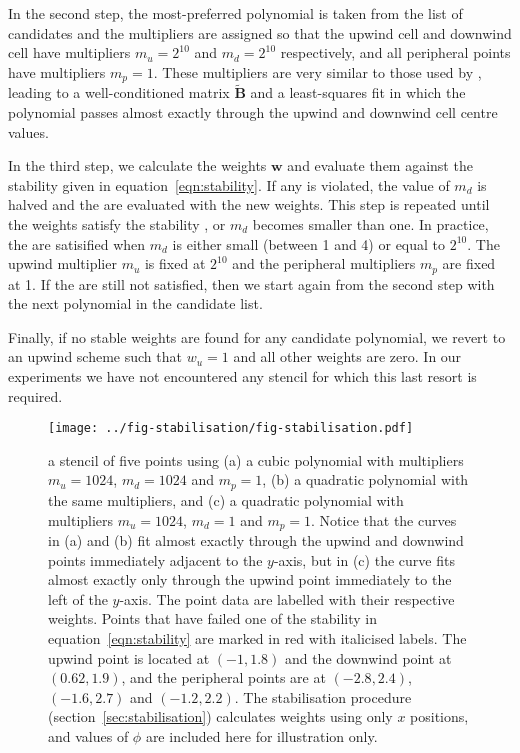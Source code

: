 In the second step, the most-preferred polynomial is taken from the list of candidates and the multipliers are assigned so that the upwind cell and downwind cell have multipliers $m_u = 2^{10}$ and $m_d = 2^{10}$ respectively, and all peripheral points have multipliers $m_p = 1$.  These multipliers are very similar to those used by \citep{lashley2002}, leading to a well-conditioned matrix $\mathbf{\tilde{B}}$ and a least-squares fit in which the polynomial passes almost exactly through the upwind and downwind cell centre values.

In the third step, we calculate the weights $\mathbf{w}$ and evaluate them against the stability  given in equation~\eqref{eqn:stability}.  If any  is violated, the value of $m_d$ is halved and the  are evaluated with the new weights.  This step is repeated until the weights satisfy the stability , or $m_d$ becomes smaller than one.  In practice, the  are satisified when $m_d$ is either small (between 1 and 4) or equal to $2^{10}$.  The upwind multiplier $m_u$ is fixed at $2^{10}$ and the peripheral multipliers $m_p$ are fixed at \num{1}.  If the  are still not satisfied, then we start again from the second step with the next polynomial in the candidate list. 

Finally, if no stable weights are found for any candidate polynomial, we revert to an upwind scheme such that $w_u = 1$ and all other weights are zero.
In our experiments we have not encountered any stencil for which this last resort is required.

\begin{figure}
	\centering
	\texttt{[image: ../fig-stabilisation/fig-stabilisation.pdf]}
%
	\caption{ a stencil of five points using (a) a cubic polynomial with multipliers $m_u = 1024$, $m_d = 1024$ and $m_p = 1$, (b) a quadratic polynomial with the same multipliers, and (c) a quadratic polynomial with multipliers $m_u = 1024$, $m_d = 1$ and $m_p = 1$.  Notice that the curves in (a) and (b) fit almost exactly through the upwind and downwind points immediately adjacent to the $y$-axis, but in (c) the curve fits almost exactly only through the upwind point immediately to the left of the $y$-axis.  The point data are labelled with their respective weights.  Points that have failed one of the stability  in equation~\eqref{eqn:stability} are marked in red with italicised labels.  The upwind point is located at $(-1, 1.8)$ and the downwind point at $(0.62, 1.9)$, and the peripheral points are at $(-2.8, 2.4)$, $(-1.6, 2.7)$ and $(-1.2, 2.2)$.  The stabilisation procedure (section~\ref{sec:stabilisation}) calculates weights using only $x$ positions, and values of $\phi$ are included here for illustration only.}
	\label{fig:oscillatory1D}
\end{figure}

